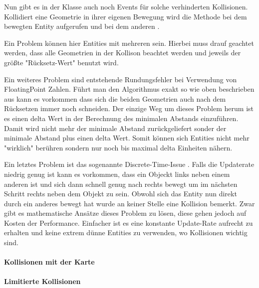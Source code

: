 Nun gibt es in der Klasse  auch noch Events für solche verhinderten Kollisionen. Kollidiert eine Geometrie in ihrer eigenen Bewegung wird die Methode  bei dem bewegten Entity aufgerufen und bei dem anderen .

Ein Problem können hier Entities mit mehreren  sein. Hierbei muss drauf geachtet werden, dass alle Geometrien in der Kollison beachtet werden und jeweils der größte "Rücksetz-Wert" benutzt wird.

Ein weiteres Problem sind entstehende Rundungsfehler bei Verwendung von FloatingPoint Zahlen. Führt man den Algorithmus exakt so wie oben beschrieben aus kann es vorkommen dass sich die beiden Geometrien auch nach dem Rücksetzen immer noch schneiden. Der einzige Weg um dieses Problem herum ist es einen delta Wert in der Berechnung des minimalen Abstands einzuführen. Damit wird nicht mehr der minimale Abstand zurückgeliefert sonder der minimale Abstand plus einen delta Wert. Somit können sich Entities nicht mehr "wirklich" berühren sondern nur noch bis maximal delta Einheiten nähern.

Ein letztes Problem ist das sogenannte Discrete-Time-Issue \cite[S 503]{DGIJ}. Falls die Updaterate niedrig genug ist kann es vorkommen, dass ein Objeckt links neben einem anderen ist und sich dann schnell genug nach rechts bewegt um im nächsten Schritt rechts neben dem Objekt zu sein. Obwohl sich das Entity nun direkt durch ein anderes bewegt hat wurde an keiner Stelle eine Kollision bemerkt. Zwar gibt es mathematische Ansätze dieses Problem zu lösen, diese gehen jedoch auf Kosten der Performance. Einfacher ist es eine konstante Update-Rate aufrecht zu erhalten und keine extrem dünne Entities zu verwenden, wo Kollisionen wichtig sind.


\paragraph{Kollisionen mit der Karte}


\paragraph{Limitierte Kollisionen}

